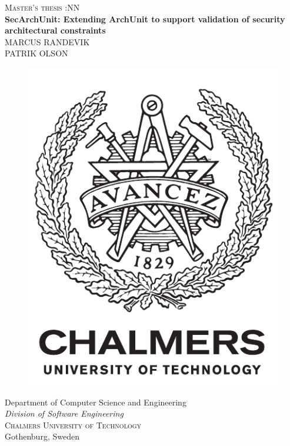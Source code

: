 \newpage
\thispagestyle{empty}
\begin{center}
	\textsc{\large Master's thesis \the\year:NN}\\[4cm]		%
	\textbf{\Large SecArchUnit: Extending ArchUnit to support validation of security architectural constraints} \\[1cm]
	{\large MARCUS RANDEVIK}\\
	{\large PATRIK OLSON}
	
	\vfill	
	\begin{figure}[H]
	\centering
	\includegraphics[width=0.2\pdfpagewidth]{figure/auxiliary/logo_eng.pdf} \\	
	\end{figure}	\vspace{5mm}	
	
	Department of Computer Science and Engineering \\
	\emph{Division of Software Engineering}\\
	\textsc{Chalmers University of Technology} \\
	Gothenburg, Sweden \the\year \\
\end{center}


